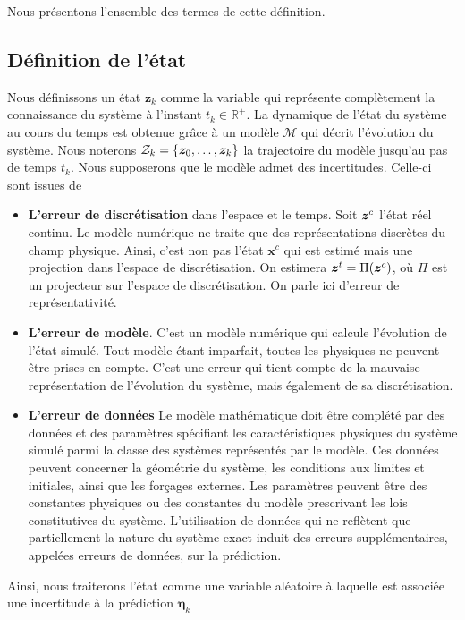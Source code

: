 Nous présentons l'ensemble des termes de cette définition.

\subsection{Définition de l'état}

Nous définissons un état $\bm z_k$ comme la variable qui représente complètement la connaissance du système à l'instant $t_k \in \mathbb R^+$. La dynamique de l'état du système au cours du temps est obtenue grâce à un modèle $\mathcal{M}$ qui décrit l'évolution du système.
Nous noterons $\mathcal Z_k = \{\bm z_0, \dots, \bm z_k\}$ la trajectoire du modèle jusqu'au pas de temps $t_k$.
Nous supposerons que le modèle admet des incertitudes. Celle-ci sont issues de

\begin{itemize}
    \item \textbf{L'erreur de discrétisation} dans l'espace et le temps. Soit $\bm z^c$ l'état réel continu. Le modèle numérique ne traite que des représentations discrètes du champ physique. Ainsi, c'est non pas l'état $\bm x^c$ qui est estimé mais une projection dans l'espace de discrétisation. On estimera $\bm z^t = \Pi(\bm z^c)$, où $\Pi$ est un projecteur sur l'espace de discrétisation. On parle ici d'erreur de représentativité.
    \item \textbf{L'erreur de modèle}. C'est un modèle numérique qui calcule l'évolution de l'état simulé. Tout modèle étant imparfait, toutes les physiques ne peuvent être prises en compte. C'est une erreur qui tient compte de la mauvaise représentation de l'évolution du système, mais également de sa discrétisation.
    \item \textbf{L'erreur de données} Le modèle mathématique doit être complété par des données et des paramètres spécifiant les caractéristiques physiques du système simulé parmi la classe des systèmes représentés par le modèle. Ces données peuvent concerner la géométrie du système, les conditions aux limites et initiales, ainsi que les forçages externes. Les paramètres peuvent être des constantes physiques ou des constantes du modèle prescrivant les lois constitutives du système. L'utilisation de données qui ne reflètent que partiellement la nature du système exact induit des erreurs supplémentaires, appelées erreurs de données, sur la prédiction.
\end{itemize}

Ainsi, nous traiterons l'état comme une variable aléatoire à laquelle est associée une incertitude à la prédiction $\bm \eta_k$

